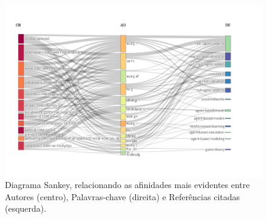 \begin{figure}
    \centering
    \includegraphics[angle=90,width=1\textwidth,height=0.9\textheight]{exploratory-data-analysis/jhcf/PesqBibliogr/SimulacaoMultiagente/WoS-20220203/Descritiva/MASSA2-Three-Fields-Plot-CR-AU-DE.png}
    \caption{Diagrama Sankey, relacionando as afinidades mais evidentes entre Autores (centro), Palavras-chave (direita) e Referências citadas (esquerda).}
    \label{fig:MASSA2:Sankey:CR-AU-DE}
\end{figure}

